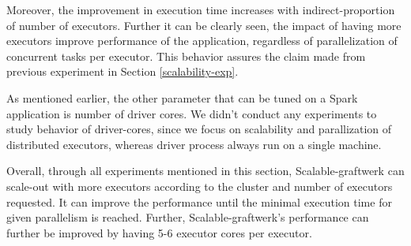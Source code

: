 Moreover, the improvement in execution time increases with indirect-proportion of number of executors. Further it can be clearly seen, the impact of having more executors improve performance of the application, regardless of parallelization of concurrent tasks per executor. This behavior assures the claim made from previous experiment in Section \ref{scalability-exp}. 

As mentioned earlier, the other parameter that can be tuned on a Spark application is number of driver cores. We didn't conduct any experiments to study behavior of driver-cores, since we focus on scalability and parallization of distributed executors, whereas driver process always run on a single machine. 

Overall, through all experiments mentioned in this section, Scalable-graftwerk can scale-out with more executors according to the cluster and number of executors requested. It can improve the performance until the minimal execution time for given parallelism is reached. Further, Scalable-graftwerk's performance can further be improved by having 5-6 executor cores per executor.  


